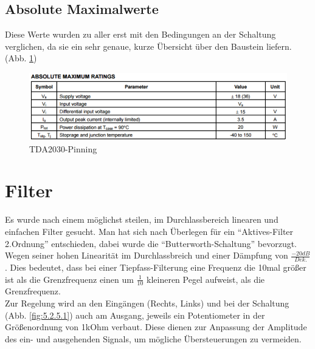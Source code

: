 \subsection{Absolute Maximalwerte}\label{subsec:3.2.1}
Diese Werte wurden zu aller erst mit den Bedingungen an der Schaltung verglichen, da sie ein sehr genaue, kurze Übersicht über den Baustein liefern. (Abb. \ref{fig:3.2.1.1})
\begin{figure} [H]
	\centering
	\includegraphics[width=1\textwidth]{img/Print5/TDA2030MaximumRatings.PNG}
	\caption{TDA2030-Pinning}
	\label {fig:3.2.1.1}
\end{figure}


\section{Filter}\label{sec:3.3}
Es wurde nach einem möglichst steilen, im Durchlassbereich linearen und einfachen Filter gesucht. Man hat sich nach Überlegen für ein \enquote{Aktives-Filter 2.Ordnung} entschieden, dabei wurde die \enquote{Butterworth-Schaltung} bevorzugt. Wegen seiner hohen Linearität im Durchlassbreich und einer Dämpfung von $\frac{-20dB}{Dek.}$ . Dies bedeutet, dass bei einer Tiepfass-Filterung eine Frequenz die 10mal größer ist als die Grenzfrequenz einen um $\frac{1}{10}$ kleineren Pegel aufweist, als die Grenzfrequenz.\\
Zur Regelung wird an den Eingängen (Rechts, Links) und bei der Schaltung (Abb. \ref{fig:5.2.5.1}) auch am Ausgang, jeweils ein Potentiometer in der Größenordnung von 1kOhm verbaut. Diese dienen zur Anpassung der Amplitude des ein- und ausgehenden Signals, um mögliche Übersteuerungen zu vermeiden.

